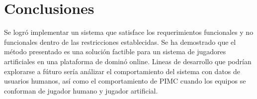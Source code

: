 \chapter*{Conclusiones}


\noindent
Se logró implementar un sistema que satisface los requerimientos funcionales y
no funcionales dentro de las restricciones establecidas. Se ha demostrado que el
método presentado es una solución factible para un sistema de jugadores
artificiales en una plataforma de dominó online. Lineas de desarrollo que
podrían explorarse a fúturo sería análizar el comportamiento del sistema con
datos de usuarios humanos, así como el comportamiento de  PIMC cuando los
equipos se conforman de jugador humano y jugador artificial.